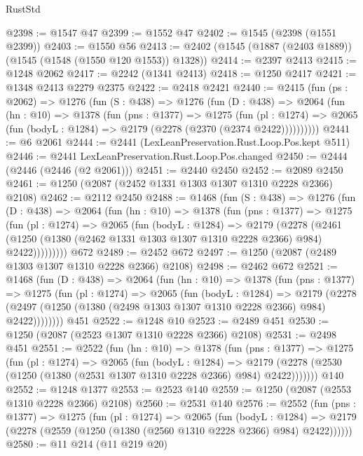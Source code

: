 \begin{lexlean}{RustStd}
\begin{coremodule}
@2398 := @1547 @47
@2399 := @1552 @47
@2402 := @1545 (@2398 (@1551 @2399))
@2403 := @1550 @56
@2413 := @2402 (@1545 (@1887 (@2403 @1889)) (@1545 (@1548 (@1550 @120 @1553)) @1328))
@2414 := @2397 @2413
@2415 := @1248 @2062
@2417 := @2242 (@1341 @2413)
@2418 := @1250 @2417
@2421 := @1348 @2413 @2279 @2375
@2422 := @2418 @2421
@2440 := @2415
    (fun (ps : @2062) =>
    @1276
      (fun (S : @438) =>
      @1276
        (fun (D : @438) =>
        @2064
          (fun (hn : @10) =>
          @1378
            (fun (pns : @1377) =>
            @1275
              (fun (pl : @1274) =>
              @2065 (fun (bodyL : @1284) => @2179 (@2278 (@2370 (@2374 @2422))))))))))
@2441 := @6 @2061
@2444 := @2441 (LexLeanPreservation.Rust.Loop.Pos.kept @511)
@2446 := @2441 LexLeanPreservation.Rust.Loop.Pos.changed
@2450 := @2444 (@2446 (@2446 (@2 @2061)))
@2451 := @2440 @2450
@2452 := @2089 @2450
@2461 := @1250 (@2087 (@2452 @1331 @1303 @1307 @1310 @2228 @2366) @2108)
@2462 := @2112 @2450
@2488 := @1468
    (fun (S : @438) =>
    @1276
      (fun (D : @438) =>
      @2064
        (fun (hn : @10) =>
        @1378
          (fun (pns : @1377) =>
          @1275
            (fun (pl : @1274) =>
            @2065
              (fun (bodyL : @1284) =>
              @2179
                (@2278
                  (@2461
                    (@1250 (@1380 (@2462 @1331 @1303 @1307 @1310 @2228 @2366) @984) @2422)))))))))
    @672
@2489 := @2452 @672
@2497 := @1250 (@2087 (@2489 @1303 @1307 @1310 @2228 @2366) @2108)
@2498 := @2462 @672
@2521 := @1468
    (fun (D : @438) =>
    @2064
      (fun (hn : @10) =>
      @1378
        (fun (pns : @1377) =>
        @1275
          (fun (pl : @1274) =>
          @2065
            (fun (bodyL : @1284) =>
            @2179
              (@2278 (@2497 (@1250 (@1380 (@2498 @1303 @1307 @1310 @2228 @2366) @984) @2422))))))))
    @451
@2522 := @1248 @10
@2523 := @2489 @451
@2530 := @1250 (@2087 (@2523 @1307 @1310 @2228 @2366) @2108)
@2531 := @2498 @451
@2551 := @2522
    (fun (hn : @10) =>
    @1378
      (fun (pns : @1377) =>
      @1275
        (fun (pl : @1274) =>
        @2065
          (fun (bodyL : @1284) =>
          @2179 (@2278 (@2530 (@1250 (@1380 (@2531 @1307 @1310 @2228 @2366) @984) @2422)))))))
    @140
@2552 := @1248 @1377
@2553 := @2523 @140
@2559 := @1250 (@2087 (@2553 @1310 @2228 @2366) @2108)
@2560 := @2531 @140
@2576 := @2552
    (fun (pns : @1377) =>
    @1275
      (fun (pl : @1274) =>
      @2065
        (fun (bodyL : @1284) =>
        @2179 (@2278 (@2559 (@1250 (@1380 (@2560 @1310 @2228 @2366) @984) @2422))))))
@2580 := @11 @214 (@11 @219 @20)

\end{coremodule}
\end{lexlean}
